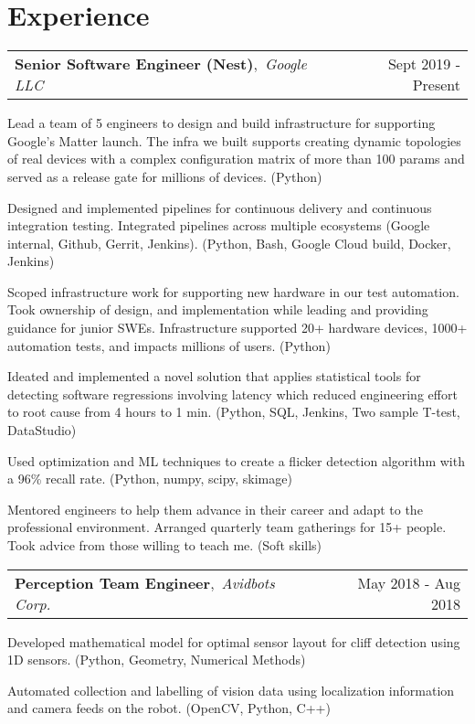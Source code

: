 \documentclass[a4paper]{article}
\makeatletter
\newcommand{\headeralgined}[2]{%
\normalfont%
\begin{tabular*}{\textwidth}{l@{\extracolsep{\fill}}r}%
  #1 & #2 \\%
\end{tabular*}%
\vspace{-6pt}%
}
\newcommand{\experience}[3]{%
  \headeralgined{%
    \textbf{#1},~\textit{#2}%
  }{#3}%
  \vspace{1pt}
}
\newcommand{\resumeitemstartlist}{\begin{itemize}[leftmargin=*]}
\newcommand{\resumeitemendlist}{\end{itemize}\vspace{2pt}}
\newcommand{\resumeitem}[1]{%
  \item{\normalsize{#1\vspace{-4pt}}}%
}
\newcommand{\tech}[1]{%
\textcolor{tealblue}{#1}%
}
\makeatother
\begin{document}

\section{Experience}


\experience{Senior Software Engineer (Nest)}{Google LLC}{Sept 2019 - Present}
\resumeitemstartlist
{%
  \resumeitem{%
    Lead a team of 5 engineers to design and build infrastructure for supporting Google's Matter launch.
    The infra we built supports creating dynamic topologies of real devices with a complex configuration
    matrix of more than 100 params and served as a release gate for millions of devices.
    \tech{(Python)}
  }
  \resumeitem{%
    Designed and implemented pipelines for continuous delivery and continuous integration testing.
    Integrated pipelines across multiple ecosystems (Google internal, Github, Gerrit, Jenkins).
    \tech{(Python, Bash, Google Cloud build, Docker, Jenkins)}
  }
  \resumeitem{%
    Scoped infrastructure work for supporting new hardware in our test automation.
    Took ownership of design, and implementation while leading and providing guidance for junior SWEs.
    Infrastructure supported 20+ hardware devices, 1000+ automation tests, and impacts millions of users.
    \tech{(Python)}
  }
  \resumeitem{%
    Ideated and implemented a novel solution that applies statistical tools for detecting software
    regressions involving latency which reduced engineering effort to root cause from 4 hours to 1 min.
    \tech{(Python, SQL, Jenkins, Two sample T-test, DataStudio)}
  }
  \resumeitem{%
    Used optimization and ML techniques to create a flicker detection algorithm with a 96\% recall rate.
    \tech{(Python, numpy, scipy, skimage)}
  }
  \resumeitem{%
    Mentored engineers to help them advance in their career and adapt to the professional environment.
    Arranged quarterly team gatherings for 15+ people.
    Took advice from those willing to teach me.
    \tech{(Soft skills)}
  }
}
\resumeitemendlist


\experience{Perception Team Engineer}{Avidbots Corp.}{May 2018 - Aug 2018}
\resumeitemstartlist
{%
  \resumeitem{%
    Developed mathematical model for optimal sensor layout for cliff detection using 1D sensors.
    \tech{(Python, Geometry, Numerical Methods)}
  }
  \resumeitem{%
    Automated collection and labelling of vision data using localization information and camera feeds on the robot.
    \tech{(OpenCV, Python, C++)}
  }
}
\resumeitemendlist
\end{document}
